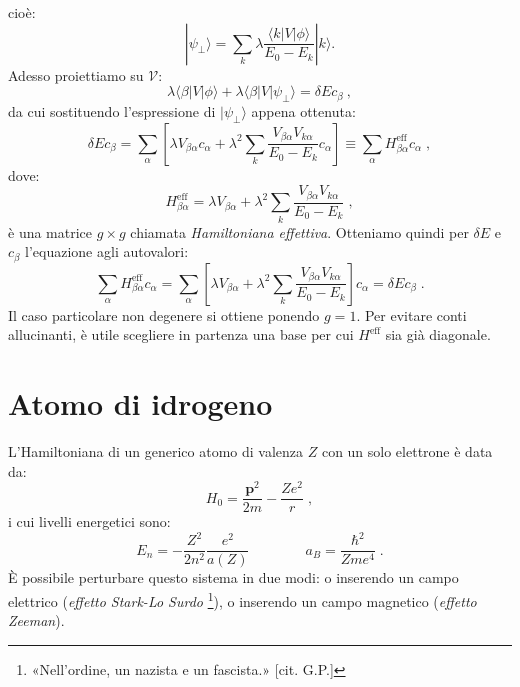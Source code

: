 \documentclass[10pt,a4paper]{report}
\theoremstyle{definition}
\numberwithin{equation}{section}
\newcommand{\bra}{\langle}
\newcommand{\ket}{\rangle}
\begin{document}
cioè:
\begin{equation}
|\psi_{\perp}\ket=\sum_k \lambda\frac{\bra k|V|\phi\ket}{E_0-E_k}|k\ket.
\end{equation}
Adesso proiettiamo su $\mathcal{V}$:
\begin{equation}
\lambda\bra\beta|V|\phi\ket+\lambda\bra\beta|V|\psi_{\perp}\ket=\delta E c_{\beta}\:,
\end{equation}
da cui sostituendo l'espressione di $|\psi_{\perp}\ket$ appena ottenuta:
\begin{equation}
\delta E c_{\beta}=\sum_{\alpha}\left[\lambda V_{\beta\alpha}c_{\alpha}+\lambda^2\sum_k\frac{V_{\beta\alpha}V_{k\alpha}}{E_0-E_k}c_{\alpha}\right]\equiv \sum_{\alpha} H^{\mathrm{eff}}_{\beta\alpha}c_{\alpha}\;,
\end{equation}
dove:
\begin{equation}
H^{\mathrm{eff}}_{\beta\alpha}=\lambda V_{\beta\alpha}+\lambda^2\sum_k\frac{V_{\beta\alpha}V_{k\alpha}}{E_0-E_k}\;,
\end{equation}
è una matrice $g\times g$ chiamata \textit{Hamiltoniana effettiva}. Otteniamo quindi per $\delta E$ e $c_{\beta}$ l'equazione agli autovalori:
\begin{equation}
\sum_{\alpha} H^{\mathrm{eff}}_{\beta\alpha}c_{\alpha}=\sum_{\alpha}\left[\lambda V_{\beta\alpha}+\lambda^2\sum_k \frac{V_{\beta\alpha}V_{k\alpha}}{E_0-E_k}\right]c_{\alpha}=\delta Ec_{\beta}\;.
\end{equation}
Il caso particolare non degenere si ottiene ponendo $g=1$. Per evitare conti allucinanti, è utile scegliere in partenza una base per cui $H^{\mathrm{eff}}$ sia già diagonale.
\section{Atomo di idrogeno}
L'Hamiltoniana di un generico atomo di valenza $Z$ con un solo elettrone è data da:
\begin{equation}
H_0=\frac{\mathbf{p}^2}{2m}-\frac{Ze^2}{r}\;,
\end{equation}
i cui livelli energetici sono:
\begin{equation}
E_n=-\frac{Z^2}{2n^2}\frac{e^2}{a(Z)} \qquad \qquad a_B=\frac{\hbar^2}{Zme^4}\;.
\end{equation}
È possibile perturbare questo sistema in due modi: o inserendo un campo elettrico (\textit{effetto Stark-Lo Surdo} \footnote{«Nell'ordine, un nazista e un fascista.» [cit. G.P.]}), o inserendo un campo magnetico (\textit{effetto Zeeman}).
\end{document}
